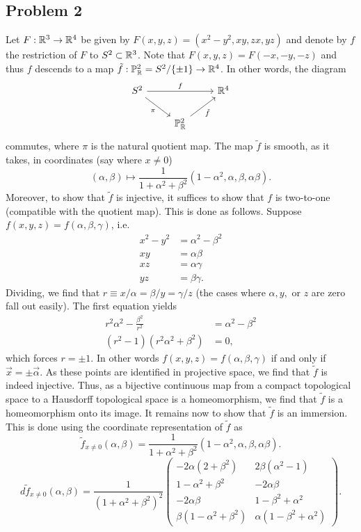 \documentclass{../mathnotes}
\begin{document}
\subsection*{Problem 2}
Let $F:\mathbb{R}^3\to\mathbb{R}^4$ be given by $F(x,y,z)=(x^2-y^2,xy,zx,yz)$ and denote by $f$ the restriction of $F$
to $S^2\subset\mathbb{R}^3$. Note that $F(x,y,z)=F(-x,-y,-z)$ and thus $f$ descends to a map
$\tilde f:\mathbb{P}_{\mathbb{R}}^2=S^2/\{\pm 1\}\to\mathbb{R}^4$. In other words, the diagram
\begin{equation*}
    \begin{tikzcd}
        S^2\ar{rr}{f}\ar[swap]{rd}{\pi} & & \R^4\\
        & \Proj^2_\R\ar[swap]{ur}{\tilde f} &
    \end{tikzcd}
\end{equation*}
commutes, where $\pi$ is the natural quotient map. The map $\tilde f$ is smooth, as it takes, in coordinates
(say where $x\neq0$)
\[(\alpha,\beta)\mapsto\frac{1}{1+\alpha^2+\beta^2}\left(1-\alpha^2,\alpha,\beta,\alpha\beta\right).\]
Moreover, to show that $\tilde f$ is injective, it suffices to show that $f$ is two-to-one (compatible
with the quotient map). This is done as follows. Suppose $f(x,y,z)=f(\alpha,\beta,\gamma)$, i.e.
\begin{align*}
    x^2-y^2 &= \alpha^2-\beta^2\\
    xy &= \alpha\beta\\
    xz &= \alpha\gamma\\
    yz &= \beta\gamma.
\end{align*}
Dividing, we find that $r\equiv x/\alpha=\beta/y=\gamma/z$ (the cases where $\alpha,y,$ or $z$ are zero
fall out easily). The first equation yields
\begin{align*}
    r^2\alpha^2-\frac{\beta^2}{r^2} &= \alpha^2-\beta^2\\
    (r^2-1)(r^2\alpha^2+\beta^2) &= 0,
\end{align*}
which forces $r=\pm 1$. In other words $f(x,y,z)=f(\alpha,\beta,\gamma)$ if and only if $\vec x=\pm\vec \alpha$.
As these points are identified in projective space, we find that $\tilde f$ is indeed injective.
Thus, as a bijective continuous map from a compact topological space to a Hausdorff topological space
is a homeomorphism, we find that $\tilde f$ is a homeomorphism onto its image. It remains now
to show that $\tilde f$ is an immersion. This is done using the coordinate representation
of $\tilde f$ as
\[\tilde f_{x\neq 0}(\alpha,\beta)=\frac{1}{1+\alpha^2+\beta^2}(1-\alpha^2,\alpha,\beta,\alpha\beta).\]
\begin{equation*}
    d\tilde f_{x\neq0}(\alpha,\beta)=
    \frac{1}{(1+\alpha^2+\beta^2)^2}
    \begin{pmatrix}
        -2\alpha(2+\beta^2) & 2\beta(\alpha^2-1)\\
        1-\alpha^2+\beta^2 & -2\alpha\beta\\
        -2\alpha\beta&1-\beta^2+\alpha^2\\
        \beta(1-\alpha^2+\beta^2) & \alpha(1-\beta^2+\alpha^2)
    \end{pmatrix}.
\end{equation*}
\end{document}
